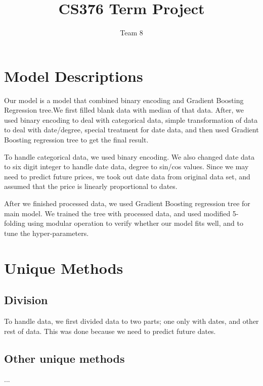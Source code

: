 \documentclass{article}
\title{CS376 Term Project}
\author{Team 8}
\begin{document}
\maketitle

\section{Model Descriptions}
Our model is a model that combined binary encoding and Gradient Boosting Regression tree.We first filled blank data with median of that data. After, we used binary encoding to deal with categorical data, simple transformation of data to deal with date/degree, special treatment for date data, and then used Gradient Boosting regression tree to get the final result.\par
To handle categorical data, we used binary encoding. We also changed date data to six digit integer to handle date data, degree to sin/cos values. Since we may need to predict future prices, we took out date data from original data set, and assumed that the price is linearly proportional to dates.\par
After we finished processed data, we used Gradient Boosting regression tree for main model. We trained the tree with processed data, and used modified 5-folding using modular operation to verify whether our model fits well, and to tune the hyper-parameters.

\section{Unique Methods}

\subsection{Division}
To handle data, we first divided data to two parts; one only with dates, and other rest of data. This was done because we need to predict future dates.

\subsection{Other unique methods}
...
\end{document}
